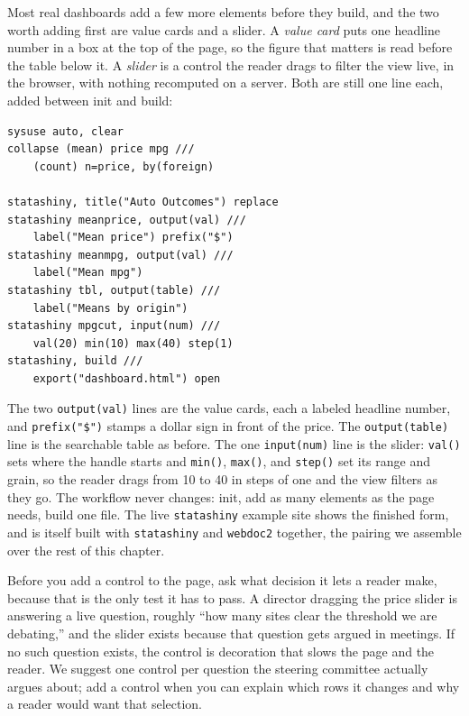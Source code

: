 \documentclass[
    a4paper,
    fontsize=10pt,
    twoside=true,
    numbers=noenddot,
]{kaobook}
\begin{document}
Most real dashboards add a few more elements before they build, and the two worth adding first are value cards and a slider. A \emph{value card} puts one headline number in a box at the top of the page, so the figure that matters is read before the table below it. A \emph{slider} is a control the reader drags to filter the view live, in the browser, with nothing recomputed on a server. Both are still one line each, added between init and build:
\par
{\footnotesize
\begin{verbatim}
sysuse auto, clear
collapse (mean) price mpg ///
    (count) n=price, by(foreign)

statashiny, title("Auto Outcomes") replace
statashiny meanprice, output(val) ///
    label("Mean price") prefix("$")
statashiny meanmpg, output(val) ///
    label("Mean mpg")
statashiny tbl, output(table) ///
    label("Means by origin")
statashiny mpgcut, input(num) ///
    val(20) min(10) max(40) step(1)
statashiny, build ///
    export("dashboard.html") open
\end{verbatim}
}
The two \texttt{output(val)} lines are the value cards, each a labeled headline number, and \texttt{prefix("\$")} stamps a dollar sign in front of the price. The \texttt{output(table)} line is the searchable table as before. The one \texttt{input(num)} line is the slider: \texttt{val()} sets where the handle starts and \texttt{min()}, \texttt{max()}, and \texttt{step()} set its range and grain, so the reader drags from 10 to 40 in steps of one and the view filters as they go. The workflow never changes: init, add as many elements as the page needs, build one file. The live \texttt{statashiny} example site shows the finished form, and is itself built with \texttt{statashiny} and \texttt{webdoc2} together, the pairing we assemble over the rest of this chapter.

Before you add a control to the page, ask what decision it lets a reader make, because that is the only test it has to pass. A director dragging the price slider is answering a live question, roughly \enquote{how many sites clear the threshold we are debating,} and the slider exists because that question gets argued in meetings. If no such question exists, the control is decoration that slows the page and the reader. We suggest one control per question the steering committee actually argues about; add a control when you can explain which rows it changes and why a reader would want that selection.
\end{document}
